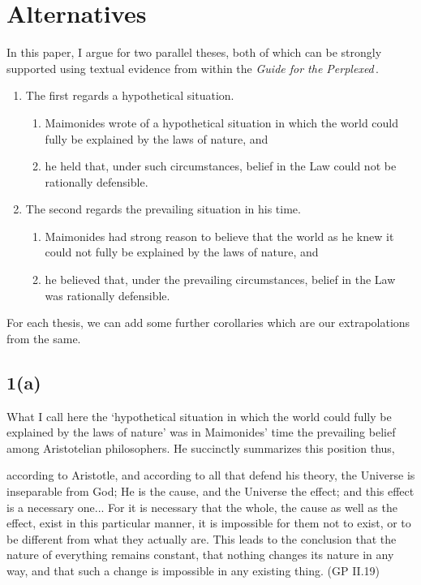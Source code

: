 \documentclass[12pt]{article}
\newcommand{\GP}{the \emph{Guide for the Perplexed}\,}
\begin{document}
\section*{Alternatives}
In this paper, I argue for two parallel theses, both of which can be strongly supported using textual evidence from within \GP.
\begin{enumerate}
\item The first regards a hypothetical situation.
\begin{enumerate}
\item Maimonides wrote of a hypothetical situation in which the world could fully be explained by the laws of nature, and
\item he held that, under such circumstances, belief in the Law could not be rationally defensible.
\end{enumerate}
\item The second regards the prevailing situation in his time.
\begin{enumerate}
\item Maimonides had strong reason to believe that the world as he knew it could not fully be explained by the laws of nature, and
\item he believed that, under the prevailing circumstances, belief in the Law was rationally defensible.
\end{enumerate}
\end{enumerate}

For each thesis, we can add some further corollaries which are our extrapolations from the same.

\subsection*{1(a)}
What I call here the `hypothetical situation in which the world could fully be explained by the laws of nature' was in Maimonides' time the prevailing belief among Aristotelian philosophers. He succinctly summarizes this position thus,
\begin{displayquote}
according to Aristotle, and according to all that defend his theory, the Universe is inseparable from God; He is the cause, and the Universe the effect; and this effect is a necessary one... For it is necessary that the whole, the cause as well as the effect, exist in this particular manner, it is impossible for them not to exist, or to be different from what they actually are. This leads to the conclusion that the nature of everything remains constant, that nothing changes its nature in any way, and that such a change is impossible in any existing thing. \hfill (GP II.19)
\end{displayquote}
\end{document}
